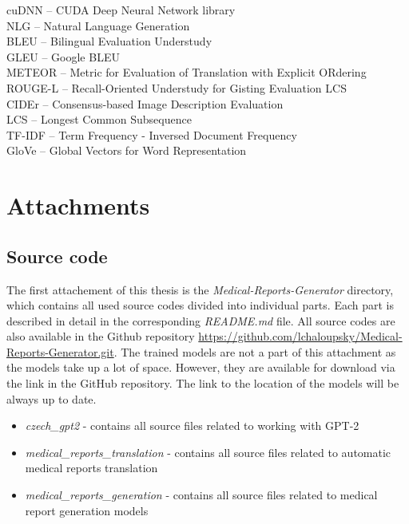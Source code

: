 \documentclass[12pt,a4paper]{report}
\begin{document}
cuDNN -- CUDA Deep Neural Network library\\
NLG -- Natural Language Generation\\
BLEU -- Bilingual Evaluation Understudy\\
GLEU -- Google BLEU\\
METEOR -- Metric for Evaluation of Translation with Explicit ORdering\\
ROUGE-L -- Recall-Oriented Understudy for Gisting Evaluation LCS\\
CIDEr -- Consensus-based Image Description Evaluation\\
LCS -- Longest Common Subsequence\\
TF-IDF -- Term Frequency - Inversed Document Frequency\\
GloVe -- Global Vectors for Word Representation

\appendix
\chapter{Attachments}

\section{Source code}
\label{add:Codes}
The first attachement of this thesis is the \textit{Medical-Reports-Generator} directory, which contains all used source codes divided into individual parts. Each part is described in detail in the corresponding \textit{README.md} file. All source codes are also available in the Github repository \url{https://github.com/lchaloupsky/Medical-Reports-Generator.git}. The trained models are not a part of this attachment as the models take up a lot of space. However, they are available for download via the link in the GitHub repository. The link to the location of the models will be always up to date.
\begin{itemize}
	\item \textit{czech\_gpt2} - contains all source files related to working with GPT-2
	\item \textit{medical\_reports\_translation} - contains all source files related to automatic medical reports translation
	\item \textit{medical\_reports\_generation} - contains all source files related to medical report generation models
\end{itemize}
\end{document}
